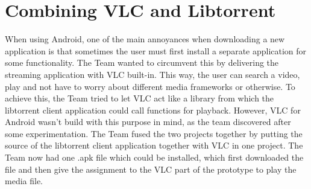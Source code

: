 \chapter{Combining VLC and Libtorrent}
\thispagestyle{fancy}
\label{sec:one_apk}
When using Android, one of the main annoyances when downloading a new application is that sometimes the user must first install a separate application for some functionality. The Team wanted to circumvent this by delivering the streaming application with VLC built-in. This way, the user can search a video, play and not have to worry about different media frameworks or otherwise. To achieve this, the Team tried to let VLC act like a library from which the libtorrent client application could call functions for playback. However, VLC for Android wasn't build with this purpose in mind, as the team discovered after some experimentation. The Team fused the two projects together by putting the source of the libtorrent client application together with VLC in one project. The Team now had one .apk file which could be installed, which first downloaded the file and then give the assignment to the VLC part of the prototype to play the media file. 